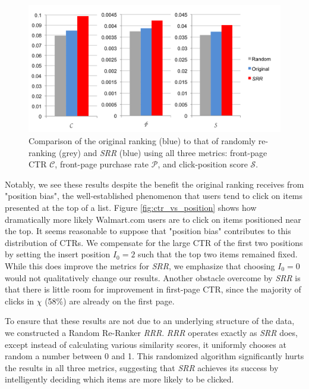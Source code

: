 \documentclass{article}
\begin{document}
\begin{figure}[htbp!]
    \centering
    \includegraphics[width=\textwidth]{moneyshot.png}
    \caption{Comparison of the original ranking (blue) to that of randomly re-ranking (grey) and {\em SRR} (blue) using all three metrics: front-page CTR $\mathscr{C}$, front-page purchase rate $\mathscr{P}$, and click-position score $\mathscr{S}$.}
    \label{fig:compare_metric_performance}
\end{figure}

Notably, we see these results despite the benefit the original ranking receives
from "position bias", the well-established phenomenon that users tend to click
on items presented at the top of a list. Figure \ref{fig:ctr_vs_position} shows
how dramatically more likely Walmart.com users are to click on items positioned
near the top. It seems reasonable to suppose that "position bias" contributes
to this distribution of CTRs. We compensate for the large CTR of the first two
positions by setting the insert position $I_0 = 2$ such that the top two items
remained fixed. While this does improve the metrics for {\em SRR}, we emphasize
that choosing $I_0 = 0$ would not qualitatively change our results. Another
obstacle overcome by {\em SRR} is that there is little room for improvement in
first-page CTR, since the majority of clicks in $\chi$ (58\%) are already
on the first page.

To ensure that these results are not due to an underlying structure of the
data, we constructed a Random Re-Ranker {\em RRR}. {\em RRR} operates exactly
as {\em SRR} does, except instead of calculating various similarity scores, it
uniformly chooses at random a number between 0 and 1. This randomized algorithm
significantly hurts the results in all three metrics, suggesting that {\em SRR}
achieves its success by intelligently deciding which items are more likely to
be clicked. 
\end{document}
